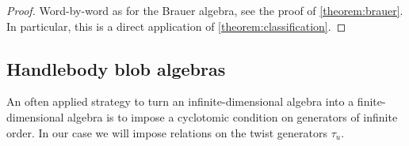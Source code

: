 \documentclass[a4paper,11pt]{amsart}
\numberwithin{equation}{section}
\let\fullref\autoref
\begin{document}
\begin{proof}
Word-by-word as for the Brauer algebra, 
see the proof of \fullref{theorem:brauer}. In particular, 
this is a direct application of \fullref{theorem:classification}.
\end{proof}

\subsection{Handlebody blob algebras}\label{subsection:handlebody-blob}

An often applied strategy to turn an infinite-dimensional algebra 
into a finite-dimensional algebra is to impose 
a cyclotomic condition on generators of infinite order.
In our case we will impose relations on the twist 
generators $\tau_{u}$.
\end{document}
